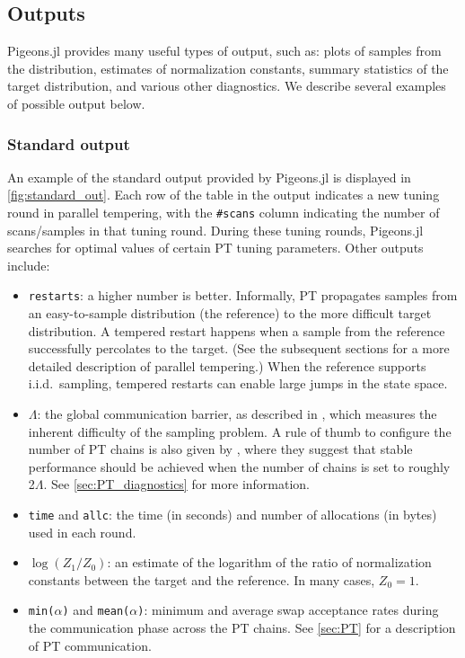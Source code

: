\subsection{Outputs}
Pigeons.jl provides many useful types of output, such as: plots of samples from 
the distribution, estimates of normalization constants, summary statistics of 
the target distribution, and various other diagnostics. 
We describe several examples of possible output below.


\subsubsection{Standard output}
An example of the standard output provided by Pigeons.jl is displayed in \cref{fig:standard_out}. 
Each row of the table in the output indicates a new tuning round in parallel tempering, 
with the \texttt{\#scans} column indicating the number of scans/samples in 
that tuning round. 
During these tuning rounds, Pigeons.jl searches for optimal values of certain PT 
tuning parameters. Other outputs include: 
\begin{itemize}
    \item \texttt{restarts}: a higher number is better. 
    Informally, PT propagates samples from an easy-to-sample distribution (the reference) 
    to the more difficult target distribution. 
    A tempered restart happens when a sample from the reference successfully 
    percolates to the target. (See the subsequent sections for a more detailed description 
    of parallel tempering.) 
    When the reference supports i.i.d.~sampling, tempered restarts 
    can enable large jumps in the state space. 

    \item \texttt{$\Lambda$}: the global communication barrier, as described in \citet{syed2021nrpt}, 
    which measures the inherent difficulty of the sampling problem.
    A rule of thumb to configure the number of PT chains is also 
    given by \citet{syed2021nrpt}, where they suggest that stable performance 
    should be achieved when the number of chains is set to roughly 2$\Lambda$.
    See \cref{sec:PT_diagnostics} for more information.

    \item \texttt{time} and \texttt{allc}: the time (in seconds) and number of 
    allocations (in bytes) used in each round.

    \item \texttt{$\log(Z_1/Z_0)$}: an estimate of the 
    logarithm of the ratio of normalization constants between the target and the reference. 
    In many cases, $Z_0 = 1$.

    \item \texttt{min($\alpha$)} and \texttt{mean($\alpha$)}: minimum and average swap 
    acceptance rates during the communication phase across the PT chains.
    See \cref{sec:PT} for a description of PT communication.
\end{itemize}


